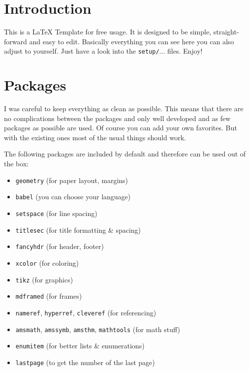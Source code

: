 





\section{Introduction}

This is a \LaTeX{} Template for free usage. It is designed to be simple, straight-forward and easy to edit.
Basically everything you can see here you can also adjust to yourself. Just have a look into the \texttt{setup/$\dotso$} files. Enjoy!

\section{Packages}

I was careful to keep everything as clean as possible. This means that there are
no complications between the packages and only well developed and as few
packages as possible are used. Of course you can add your own favorites. But
with the existing ones most of the usual things should work.

The following packages are included by default and therefore can be used out of
the box:

\begin{itemize}
\item \texttt{geometry} (for paper layout, margins)
\item \texttt{babel} (you can choose your language)
\item \texttt{setspace} (for line spacing)
\item \texttt{titlesec} (for title formatting \& spacing)
\item \texttt{fancyhdr} (for header, footer)
\item \texttt{xcolor} (for coloring)
\item \texttt{tikz} (for graphics)
\item \texttt{mdframed} (for frames)
\item \texttt{nameref}, \texttt{hyperref}, \texttt{cleveref} (for referencing)
\item \texttt{amsmath}, \texttt{amssymb}, \texttt{amsthm}, \texttt{mathtools}
  (for math stuff)
\item \texttt{enumitem} (for better lists \& enumerations)
\item \texttt{lastpage} (to get the number of the last page)
\end{itemize}

